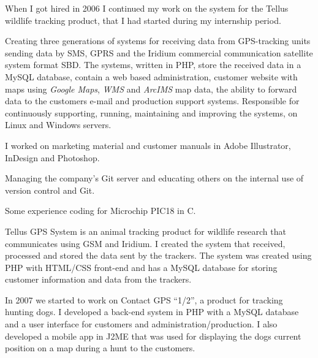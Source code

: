 \documentclass{cv-stylish}
\begin{document}
\begin{center}
\begin{InfoBody}
When I got hired in 2006 I continued my work on the system for the
Tellus wildlife tracking product, that I had started during my
internship period.

\begin{compactitem}
  \item Creating three generations of systems for receiving data from
    GPS-tracking units sending data by SMS, GPRS and the Iridium
    commercial communication satellite system format SBD.
    The systems, written in PHP, store the received data in a MySQL
    database, contain a web based administration, customer website
    with maps using \emph{Google Maps}, \emph{WMS} and \emph{ArcIMS} map data, the ability to forward
    data to the customers e-mail and production support
    systems. Responsible for continuously supporting, running,
    maintaining and improving the systems, on Linux and Windows
    servers.
  \item I worked on marketing material and customer manuals in Adobe
    Illustrator, InDesign and Photoshop.
  \item Managing the company's Git server and educating others on the
    internal use of version control and Git.
  \item Some experience coding for Microchip PIC18 in C.
\end{compactitem}

Tellus GPS System is an animal tracking product for wildlife research
that communicates using GSM and Iridium. I created the system that
received, processed and stored the data sent by the trackers. The
system was created using PHP with HTML/CSS front-end and has
a MySQL database for storing customer information and data from the
trackers.

In 2007 we started to work on Contact GPS ``1/2'', a product for tracking
hunting dogs. I developed a back-end system in PHP with a MySQL
database and a user interface for customers and
administration/production.
I also developed a mobile app in J2ME that was used for displaying the
dogs current position on a map during a hunt to the customers.

\end{InfoBody}




\end{center}
\end{document}
